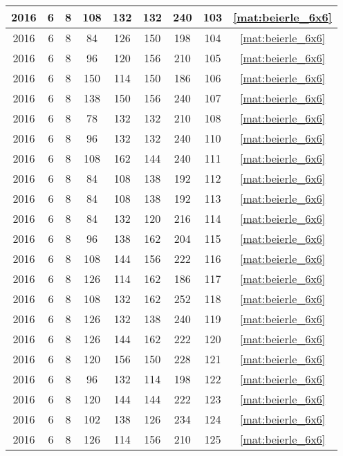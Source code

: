 \begin{longtable}{|c|c|c|c|c|c|c|c|c|}
2016 & 6 & 8 & 108 & 132 & 132 & 240 & 103 & \eqref{mat:beierle_6x6} \\ \hline 
2016 & 6 & 8 & 84 & 126 & 150 & 198 & 104 & \eqref{mat:beierle_6x6} \\ \hline 
2016 & 6 & 8 & 96 & 120 & 156 & 210 & 105 & \eqref{mat:beierle_6x6} \\ \hline 
2016 & 6 & 8 & 150 & 114 & 150 & 186 & 106 & \eqref{mat:beierle_6x6} \\ \hline 
2016 & 6 & 8 & 138 & 150 & 156 & 240 & 107 & \eqref{mat:beierle_6x6} \\ \hline 
2016 & 6 & 8 & 78 & 132 & 132 & 210 & 108 & \eqref{mat:beierle_6x6} \\ \hline 
2016 & 6 & 8 & 96 & 132 & 132 & 240 & 110 & \eqref{mat:beierle_6x6} \\ \hline 
2016 & 6 & 8 & 108 & 162 & 144 & 240 & 111 & \eqref{mat:beierle_6x6} \\ \hline 
2016 & 6 & 8 & 84 & 108 & 138 & 192 & 112 & \eqref{mat:beierle_6x6} \\ \hline 
2016 & 6 & 8 & 84 & 108 & 138 & 192 & 113 & \eqref{mat:beierle_6x6} \\ \hline 
2016 & 6 & 8 & 84 & 132 & 120 & 216 & 114 & \eqref{mat:beierle_6x6} \\ \hline 
2016 & 6 & 8 & 96 & 138 & 162 & 204 & 115 & \eqref{mat:beierle_6x6} \\ \hline 
2016 & 6 & 8 & 108 & 144 & 156 & 222 & 116 & \eqref{mat:beierle_6x6} \\ \hline 
2016 & 6 & 8 & 126 & 114 & 162 & 186 & 117 & \eqref{mat:beierle_6x6} \\ \hline 
2016 & 6 & 8 & 108 & 132 & 162 & 252 & 118 & \eqref{mat:beierle_6x6} \\ \hline 
2016 & 6 & 8 & 126 & 132 & 138 & 240 & 119 & \eqref{mat:beierle_6x6} \\ \hline 
2016 & 6 & 8 & 126 & 144 & 162 & 222 & 120 & \eqref{mat:beierle_6x6} \\ \hline 
2016 & 6 & 8 & 120 & 156 & 150 & 228 & 121 & \eqref{mat:beierle_6x6} \\ \hline 
2016 & 6 & 8 & 96 & 132 & 114 & 198 & 122 & \eqref{mat:beierle_6x6} \\ \hline 
2016 & 6 & 8 & 120 & 144 & 144 & 222 & 123 & \eqref{mat:beierle_6x6} \\ \hline 
2016 & 6 & 8 & 102 & 138 & 126 & 234 & 124 & \eqref{mat:beierle_6x6} \\ \hline 
2016 & 6 & 8 & 126 & 114 & 156 & 210 & 125 & \eqref{mat:beierle_6x6} \\ \hline 

\end{longtable}
